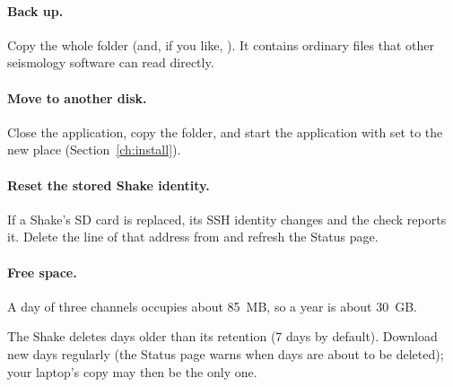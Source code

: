 \paragraph{Back up.} Copy the whole  folder (and, if you like, ). It contains ordinary files that other
seismology software can read directly.

\paragraph{Move to another disk.} Close the application, copy the folder, and start the application with  set to
the new place (Section~\ref{ch:install}).

\paragraph{Reset the stored Shake identity.} If a Shake's SD card is replaced, its SSH identity changes and the  check reports it.
Delete the line of that address from  and refresh the Status page.

\paragraph{Free space.} A day of three channels occupies about 85~MB, so a year is about 30~GB.

\begin{rs3dwarn}
The Shake deletes days older than its retention (7 days by default). Download new days regularly (the Status page warns when days
are about to be deleted); your laptop's copy may then be the only one.
\end{rs3dwarn}
